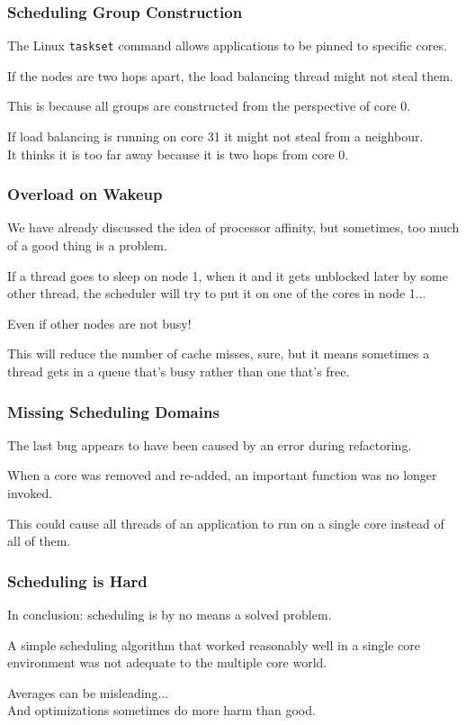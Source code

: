 \begin{frame}
\frametitle{Scheduling Group Construction}

The Linux \texttt{taskset} command allows applications to be pinned to specific cores. 

If the nodes are two hops apart, the load balancing thread might not steal them. 

This is because all groups are constructed from the perspective of core 0. 

If load balancing is running on core 31 it might not steal from a neighbour.\\
\quad It thinks it is too far away because it is two hops from core 0.

\end{frame}



\begin{frame}
\frametitle{Overload on Wakeup}

We have already discussed the idea of processor affinity, but sometimes, too much of a good thing is a problem. 

If a thread goes to sleep on node 1, when it and it gets unblocked later by some other thread, the scheduler will try to put it on one of the cores in node 1... 

Even if other nodes are not busy! 

This will reduce the number of cache misses, sure, but it means sometimes a thread gets in a queue that's busy rather than one that's free.

\end{frame}




\begin{frame}
\frametitle{Missing Scheduling Domains}

The last bug appears to have been caused by an error during refactoring. 

When a core was removed and re-added, an important function was no longer invoked.

This could cause all threads of an application to run on a single core instead of all of them. 

\end{frame}



\begin{frame}
\frametitle{Scheduling is Hard}

In conclusion: scheduling is by no means a solved problem. 

A simple scheduling algorithm that worked reasonably well in a single core environment was not adequate to the multiple core world. 

Averages can be misleading...\\
\quad And optimizations sometimes do more harm than good. 

\end{frame}



